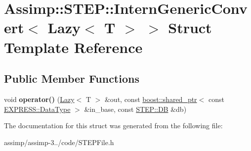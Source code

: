 \hypertarget{struct_assimp_1_1_s_t_e_p_1_1_intern_generic_convert_3_01_lazy_3_01_t_01_4_01_4}{\section{Assimp\+:\+:S\+T\+E\+P\+:\+:Intern\+Generic\+Convert$<$ Lazy$<$ T $>$ $>$ Struct Template Reference}
\label{struct_assimp_1_1_s_t_e_p_1_1_intern_generic_convert_3_01_lazy_3_01_t_01_4_01_4}
}
\subsection*{Public Member Functions}
\begin{DoxyCompactItemize}
\item 
\hypertarget{struct_assimp_1_1_s_t_e_p_1_1_intern_generic_convert_3_01_lazy_3_01_t_01_4_01_4_a303b86e2b6ec995b45cd9c3f48400c53}{void {\bfseries operator()} (\hyperlink{struct_assimp_1_1_s_t_e_p_1_1_lazy}{Lazy}$<$ T $>$ \&out, const \hyperlink{classboost_1_1shared__ptr}{boost\+::shared\+\_\+ptr}$<$ const \hyperlink{class_assimp_1_1_s_t_e_p_1_1_e_x_p_r_e_s_s_1_1_data_type}{E\+X\+P\+R\+E\+S\+S\+::\+Data\+Type} $>$ \&in\+\_\+base, const \hyperlink{class_assimp_1_1_s_t_e_p_1_1_d_b}{S\+T\+E\+P\+::\+D\+B} \&db)}\label{struct_assimp_1_1_s_t_e_p_1_1_intern_generic_convert_3_01_lazy_3_01_t_01_4_01_4_a303b86e2b6ec995b45cd9c3f48400c53}

\end{DoxyCompactItemize}


The documentation for this struct was generated from the following file\+:\begin{DoxyCompactItemize}
\item 
assimp/assimp-\/3../code/S\+T\+E\+P\+File.\+h\end{DoxyCompactItemize}
